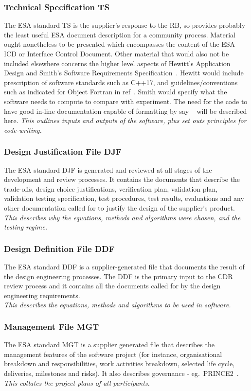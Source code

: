 \subsubsection{Technical Specification TS}\label{sec:TS}
The ESA standard TS is the supplier's response to the RB, so provides probably the least useful
ESA document description for a community process.  Material ought nonetheless to be presented
which encompasses the content of the ESA ICD or Interface Control Document. Other material
that would also not be included elsewhere concerns the higher level aspects of Hewitt's Application Design
and Smith's Software Requirements Specification~\cite[\S\,2.2.3]{Sm17Rati}. Hewitt would include
prescription of software standards such as C++17,
and guidelines/conventions such as indicated for Object Fortran in ref~\cite{y2d33}.
Smith would specify what the software needs to compute to compare with experiment.
The need for the code to have good in-line documentation capable of formatting by say ~\cite{He21doxy}
will be described here.
\emph{This outlines inputs and outputs of the software, plus set outs principles for code-writing.}
\subsubsection{Design Justification File DJF}\label{sec:DJF}
The ESA standard DJF is generated and reviewed at all stages of the development and review processes.
It contains the documents that describe the trade-offs, design choice justifications, verification plan,
validation plan, validation testing specification,
test procedures, test results, evaluations and any other documentation called for to justify the design of the supplier's product. \\ 
\emph{This describes why the equations, methods and algorithms were chosen, and the testing regime.}
\subsubsection{Design Definition File DDF}\label{sec:DDF}
The ESA standard DDF is a supplier-generated file that
documents the result of the design engineering processes.
The DDF is the primary input to the CDR review process and it contains
all the documents called for by the design engineering requirements. \\ 
\emph{This describes the equations, methods and algorithms to be used in software.}
\subsubsection{Management File MGT}\label{sec:MGT}
The ESA standard MGT is a supplier generated file
that describes the management features of the software project (for instance,
organisational breakdown and responsibilities, work activities breakdown,
selected life cycle, deliveries, milestones and risks).
It also describes governance -  eg.\ PRINCE2~\cite{prince2}. \\ 
\emph{This collates the project plans of all participants.}
